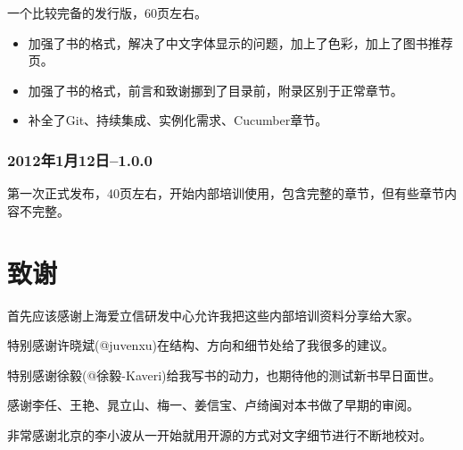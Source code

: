 一个比较完备的发行版，60页左右。

\begin{itemize}
\item 加强了书的格式，解决了中文字体显示的问题，加上了色彩，加上了图书推荐页。

\item 加强了书的格式，前言和致谢挪到了目录前，附录区别于正常章节。

\item 补全了Git、持续集成、实例化需求、Cucumber章节。

\end{itemize}

\subsection{2012年1月12日--1.0.0}
\label{2012年1月12日-1.0.0}

第一次正式发布，40页左右，开始内部培训使用，包含完整的章节，但有些章节内容不完整。

\chapter{致谢}
\label{致谢}

首先应该感谢上海爱立信研发中心允许我把这些内部培训资料分享给大家。

特别感谢许晓斌(@juvenxu)在结构、方向和细节处给了我很多的建议。

特别感谢徐毅(@徐毅-Kaveri)给我写书的动力，也期待他的测试新书早日面世。

感谢李任、王艳、晁立山、梅一、姜信宝、卢绮闽对本书做了早期的审阅。

非常感谢北京的李小波从一开始就用开源的方式对文字细节进行不断地校对。
